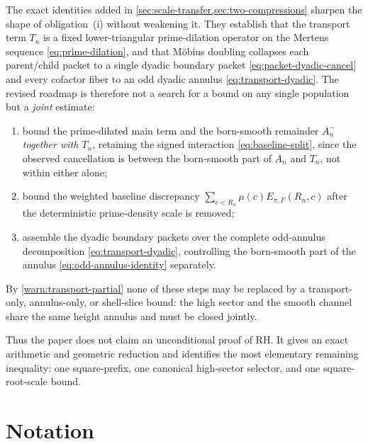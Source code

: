 \documentclass[11pt]{article}
\theoremstyle{definition}
\theoremstyle{remark}
\newcommand{\1}{\mathbf{1}}
\begin{document}
The exact identities added in \cref{sec:scale-transfer,sec:two-compressions} sharpen the shape of obligation~(i) without weakening it.  They establish that the transport term $T_n$ is a fixed lower-triangular prime-dilation operator on the Mertens sequence \eqref{eq:prime-dilation}, and that M\"obius doubling collapses each parent/child packet to a single dyadic boundary packet \eqref{eq:packet-dyadic-cancel} and every cofactor fiber to an odd dyadic annulus \eqref{eq:transport-dyadic}.  The revised roadmap is therefore not a search for a bound on any single population but a \emph{joint} estimate:
\begin{enumerate}[leftmargin=1.7em,itemsep=0.3em,label=(\alph*)]
\item bound the prime-dilated main term and the born-smooth remainder $A_n^-$ \emph{together with $T_n$}, retaining the signed interaction \eqref{eq:baseline-split}, since the observed cancellation is between the born-smooth part of $A_n$ and $T_n$, not within either alone;
\item bound the weighted baseline discrepancy $\sum_{c<R_n}\mu(c)E_{\pi,F}(R_n,c)$ after the deterministic prime-density scale is removed;
\item assemble the dyadic boundary packets over the complete odd-annulus decomposition \eqref{eq:transport-dyadic}, controlling the born-smooth part of the annulus \eqref{eq:odd-annulus-identity} separately.
\end{enumerate}
By \cref{warn:transport-partial} none of these steps may be replaced by a transport-only, annulus-only, or shell-slice bound: the high sector and the smooth channel share the same height annulus and must be closed jointly.

Thus the paper does not claim an unconditional proof of RH.  It gives an exact arithmetic and geometric reduction and identifies the most elementary remaining inequality: one square-prefix, one canonical high-sector selector, and one square-root-scale bound.


\appendix
\section{Notation}
\end{document}
